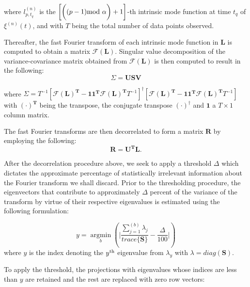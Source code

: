 \documentclass[onecolumn, groupedaddress, 10pt]{revtex4-1}
\begin{document}
where $l_{p,t_q}^{(n)}$ is the $\left[ \bigg( (p-1) \textnormal{mod } \alpha \bigg) + 1\right]$-th intrinsic mode function at time $t_q$ of $\xi^{(n)}(t)$, and with $T$ being the total number of data points observed.

Thereafter, the fast Fourier transform of each intrinsic mode function in $\mathbf{L}$ is computed to obtain a matrix $\mathcal{F} \left( \mathbf{L} \right)$. Singular value decomposition of the variance-covariance matrix obtained from $\mathcal{F}{ \left( \mathbf{L} \right) }$ is then computed to result in the following:
\begin{equation}
\Sigma = \mathbf{USV}
\end{equation}
 
where $\Sigma = T^{-1} \left[ \mathcal{F}(\mathbf{L}) ^{\mathbf{T}} - \mathbf{1}\mathbf{1}^{\mathbf{T}} \mathcal{F}(\mathbf{L})^{\mathbf{T}} T^{-1} \right]^{ \dagger } \left[ \mathcal{F}(\mathbf{L})^{\mathbf{T}} - \mathbf{1}\mathbf{1}^{\mathbf{T}} \mathcal{F}( \mathbf{L})^{\mathbf{T}} T^{-1} \right] $with $(\cdot)^\mathbf{T}$ being the transpose, the conjugate transpose $(\cdot)^\dagger$ and $\mathbf{1}$ a $T \times 1$ column matrix.


The fast Fourier transforms are then decorrelated to form a matrix $\mathbf{R}$ by employing the following:
\begin{equation}
\mathbf{R} = \mathbf{U}^{\mathbf{T}}\mathbf{L}.
\end{equation}

After the decorrelation procedure above, we seek to apply a threshold $\Delta$ which dictates the approximate percentage of statistically irrelevant information about the Fourier transform we shall discard. Prior to the thresholding procedure, the eigenvectors that contribute to approximately $\Delta$ percent of the variance of the transform by virtue of their respective eigenvalues is estimated using the following formulation:

\begin{equation}
y = \underset{b}{\operatorname{argmin}} \left( \Bigg| \frac{\sum_{j=1}^{(b)} \lambda_j}{trace \{ \mathbf{S} \}} - \frac{\Delta}{100} \Bigg| \right)
\end{equation}
where $y$ is the index denoting the $y^\textnormal{th}$ eigenvalue from $\lambda_y$ with $\lambda = diag{(\mathbf{S})}$.

To apply the threshold, the projections with eigenvalues whose indices are less than $y$ are retained and the rest are replaced with zero row vectors:
\end{document}
